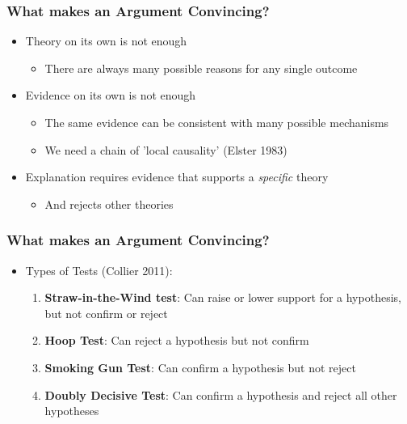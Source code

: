 \documentclass[xcolor=x11names,compress]{beamer}\usepackage[]{graphicx}\usepackage[]{color}
\renewcommand{\(}{\begin{columns}}
\renewcommand{\)}{\end{columns}}
\newcommand{\<}[1]{\begin{column}{#1}}
\renewcommand{\>}{\end{column}}
\begin{document}
\begin{frame}
\frametitle{What makes an Argument Convincing?}
\begin{itemize}
\item Theory on its own is not enough
\begin{itemize}
\item There are always many possible reasons for any single outcome
\pause
\end{itemize}
\item Evidence on its own is not enough
\begin{itemize}
\item The same evidence can be consistent with many possible mechanisms
\item We need a chain of 'local causality' (Elster 1983)
\pause
\end{itemize}
\item Explanation requires evidence that supports a \textit{specific} theory
\begin{itemize}
\item And rejects other theories
\end{itemize}
\end{itemize}
\end{frame}

\begin{frame}
\frametitle{What makes an Argument Convincing?}
\begin{itemize}
\item Types of Tests (Collier 2011):
\pause
\begin{enumerate}
\item \textbf{Straw-in-the-Wind test}: Can raise or lower support for a hypothesis, but not confirm or reject
\pause
\item \textbf{Hoop Test}: Can reject a hypothesis but not confirm
\pause
\item \textbf{Smoking Gun Test}: Can confirm a hypothesis but not reject
\pause
\item \textbf{Doubly Decisive Test}: Can confirm a hypothesis and reject all other hypotheses
\end{enumerate}
\end{itemize}
\end{frame}
\end{document}
